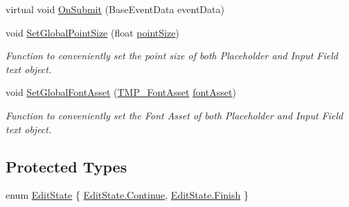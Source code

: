 \begin{DoxyCompactItemize}
\item 
virtual void \mbox{\hyperlink{class_t_m_pro_1_1_t_m_p___input_field_a5d0a7dce46ca21b97a7a1554579d2887}{On\+Submit}} (Base\+Event\+Data event\+Data)
\item 
void \mbox{\hyperlink{class_t_m_pro_1_1_t_m_p___input_field_aba2ab9700cbd18d64736530a34d91068}{Set\+Global\+Point\+Size}} (float \mbox{\hyperlink{class_t_m_pro_1_1_t_m_p___input_field_a1ac8a2780c0a65e2ed41fd216d0c4454}{point\+Size}})
\begin{DoxyCompactList}\small\item\em Function to conveniently set the point size of both Placeholder and Input Field text object. \end{DoxyCompactList}\item 
void \mbox{\hyperlink{class_t_m_pro_1_1_t_m_p___input_field_a2ed20e5b12507b1ff2e108dd99d4091f}{Set\+Global\+Font\+Asset}} (\mbox{\hyperlink{class_t_m_pro_1_1_t_m_p___font_asset}{T\+M\+P\+\_\+\+Font\+Asset}} \mbox{\hyperlink{class_t_m_pro_1_1_t_m_p___input_field_ac13a97bd7e0eb0e19b5a50efc11adb67}{font\+Asset}})
\begin{DoxyCompactList}\small\item\em Function to conveniently set the Font Asset of both Placeholder and Input Field text object. \end{DoxyCompactList}\end{DoxyCompactItemize}
\subsection*{Protected Types}
\begin{DoxyCompactItemize}
\item 
enum \mbox{\hyperlink{class_t_m_pro_1_1_t_m_p___input_field_a12fc070748fd5c39cbb8c907aa3145ee}{Edit\+State}} \{ \mbox{\hyperlink{class_t_m_pro_1_1_t_m_p___input_field_a12fc070748fd5c39cbb8c907aa3145eeaa0bfb8e59e6c13fc8d990781f77694fe}{Edit\+State.\+Continue}}, 
\mbox{\hyperlink{class_t_m_pro_1_1_t_m_p___input_field_a12fc070748fd5c39cbb8c907aa3145eeaa20ddccbb6f808ec42cd66323e6c6061}{Edit\+State.\+Finish}}
 \}
\end{DoxyCompactItemize}
